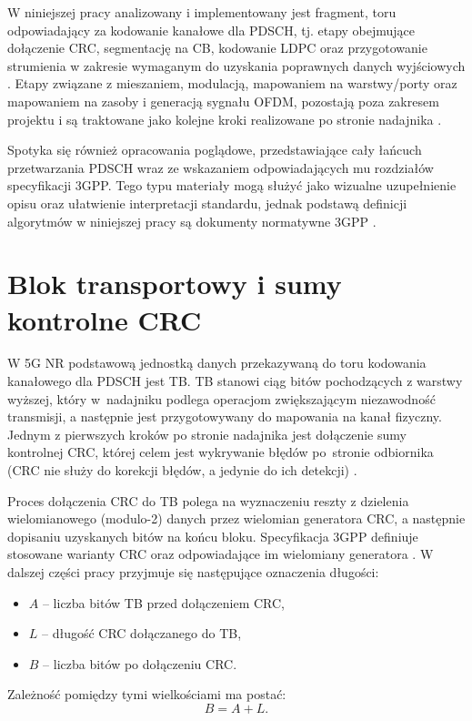 W niniejszej pracy analizowany i implementowany jest fragment, toru odpowiadający za kodowanie kanałowe dla PDSCH, tj. etapy obejmujące dołączenie CRC, segmentację na CB, kodowanie LDPC oraz przygotowanie strumienia w zakresie wymaganym do uzyskania poprawnych danych wyjściowych \cite{bib:3gpp_38212}. Etapy związane z mieszaniem, modulacją, mapowaniem na warstwy/porty oraz mapowaniem na zasoby i generacją sygnału OFDM, pozostają poza zakresem projektu i są traktowane jako kolejne kroki realizowane po stronie nadajnika \cite{bib:3gpp_38211}.

Spotyka się również opracowania poglądowe, przedstawiające cały łańcuch przetwarzania PDSCH wraz ze wskazaniem odpowiadających mu rozdziałów specyfikacji 3GPP\cite{bib:sharetechnote_pdsch}. Tego typu materiały mogą służyć jako wizualne uzupełnienie opisu oraz ułatwienie interpretacji standardu, jednak podstawą definicji algorytmów w niniejszej pracy są dokumenty normatywne 3GPP \cite{bib:3gpp_38212,bib:3gpp_38211}.


\section{Blok transportowy i sumy kontrolne CRC}
\label{sec:analiza_crc}

W 5G NR podstawową jednostką danych przekazywaną do toru kodowania kanałowego dla PDSCH jest TB. TB stanowi ciąg bitów pochodzących z warstwy wyższej, który w~nadajniku podlega operacjom zwiększającym niezawodność transmisji, a następnie jest przygotowywany do mapowania na kanał fizyczny. Jednym z pierwszych kroków po stronie nadajnika jest dołączenie sumy kontrolnej CRC, której celem jest wykrywanie błędów po~stronie odbiornika (CRC nie służy do korekcji błędów, a jedynie do ich detekcji) \cite{bib:3gpp_38212}.

Proces dołączenia CRC do TB polega na wyznaczeniu reszty z dzielenia wielomianowego (modulo-2) danych przez wielomian generatora CRC, a następnie dopisaniu uzyskanych bitów na końcu bloku. Specyfikacja 3GPP definiuje stosowane warianty CRC oraz odpowiadające im wielomiany generatora \cite{bib:3gpp_38212}. W dalszej części pracy przyjmuje się następujące oznaczenia długości:
\begin{itemize}
  \item $A$ -- liczba bitów TB przed dołączeniem CRC,
  \item $L$ -- długość CRC dołączanego do TB,
  \item $B$ -- liczba bitów po dołączeniu CRC.
\end{itemize}
Zależność pomiędzy tymi wielkościami ma postać:
\begin{equation}
B = A + L.
\label{eq:tb_crc_length}
\end{equation}

